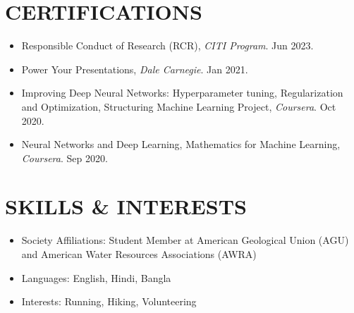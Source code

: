 \documentclass[a4paper,9pt]{extarticle}
\begin{document}
\section*{CERTIFICATIONS}
    \begin{itemize}
        \item Responsible Conduct of Research (RCR), \textit{CITI Program}. Jun 2023.
        \item Power Your Presentations, \textit{Dale Carnegie}. Jan 2021.
        \item Improving Deep Neural Networks: Hyperparameter tuning, Regularization and Optimization, Structuring Machine Learning Project, \textit{Coursera}. Oct 2020.
        \item Neural Networks and Deep Learning, Mathematics for Machine Learning, \textit{Coursera}. Sep 2020.
    \end{itemize}

\section*{SKILLS \& INTERESTS}
    \begin{itemize}
        \item Society Affiliations: Student Member at American Geological Union (AGU) and American Water Resources Associations (AWRA)
        \item Languages: English, Hindi, Bangla
        \item Interests: Running, Hiking, Volunteering
    \end{itemize}

\end{document}
